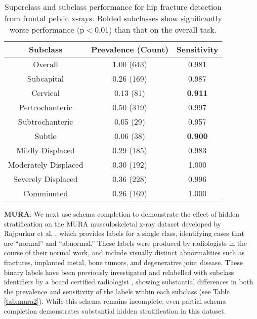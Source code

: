 \documentclass[sigconf]{acmart}
\begin{document}
\begin{table}[htb!]
\centering
\begin{tabular}{ccc}
\toprule
 Subclass & Prevalence (Count) & Sensitivity \\
 \toprule
 Overall & 1.00 (643) & 0.981  \\
 Subcapital & 0.26 (169) & 0.987   \\
 Cervical & 0.13 (81) & \textbf{0.911}\\
 Pertrochanteric & 0.50 (319)  & 0.997\\
 Subtrochanteric & 0.05 (29) & 0.957 \\
 Subtle & 0.06 (38) & \textbf{0.900}\\
 Mildly Displaced & 0.29 (185) & 0.983\\
 Moderately Displaced & 0.30 (192) & 1.000\\
 Severely Displaced & 0.36 (228) & 0.996\\
 Comminuted & 0.26 (169) & 1.000 \\ 
 \toprule
\end{tabular}
\caption{Superclass and subclass performance for hip fracture detection from frontal pelvic x-rays. Bolded subclasses show significantly worse performance (p$<$0.01) than that on the overall task.}
\label{tab:hip1}
\end{table}

\textbf{MURA}: We next use schema completion to demonstrate the effect of hidden stratification on the MURA musculoskeletal x-ray dataset developed by Rajpurkar et al. \citep{Rajpurkar2017-rc}, which provides labels for a single class, identifying cases that are ``normal'' and ``abnormal.'' 
These labels were produced by radiologists in the course of their normal work, and include visually distinct abnormalities such as fractures, implanted metal, bone tumors, and degenerative joint disease. 
These binary labels have been previously investigated and relabelled with subclass identifiers by a board certified radiologist \citep{Oakden-Rayner2019-yi}, showing substantial differences in both the prevalence and sensitivity of the labels within each subclass (see Table \ref{tab:mura2}). 
While this schema remains incomplete, even partial schema completion demonstrates substantial hidden stratification in this dataset.
\end{document}
